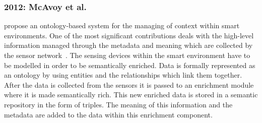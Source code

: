 \subsubsection{2012: McAvoy et al.}
\label{sec:mcavoy}

\citeauthor{mcavoy_ontology_based_2012} propose an ontology-based system for the 
managing of context within smart environments. One of the most significant 
contributions deals with the high-level information managed through the metadata 
and meaning which are collected by the sensor network~\citep{mcavoy_ontology_based_2012}. 
The sensing devices within the smart environment have to be modelled in order 
to be semantically enriched. Data is formally represented as an ontology by 
using entities and the relationships which link them together. After the data 
is collected from the sensors it is passed to an enrichment module where it is 
made semantically rich. This new enriched data is stored in a semantic 
repository in the form of triples. The meaning of this information and the 
metadata are added to the data within this enrichment component. 

